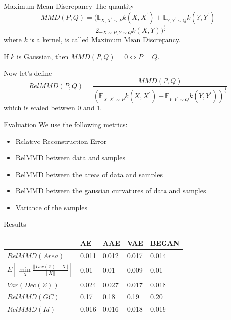 \documentclass{beamer}
\begin{document}
\begin{frame}{Maximum Mean Discrepancy}
The quantity $$MMD(P, Q)= (\mathbb{E}_{X, X^{\prime} \sim P} k\left(X, X^{\prime}\right)+\mathbb{E}_{Y, Y^{\prime} \sim Q} k\left(Y, Y^{\prime}\right)$$ $$-2 \mathbb{E}_{X \sim P, Y \sim Q} k(X, Y))^{\frac{1}{2}}$$ where $k$ is a kernel, is called Maximum Mean Discrepancy.
\begin{theorem}
If $k$ is Gaussian, then $MMD(P,Q)=0\Leftrightarrow P=Q$.
\end{theorem}
Now let's define $$RelMMD(P,Q)=\frac{MMD(P,Q)}{(\mathbb{E}_{X, X^{\prime} \sim P} k\left(X, X^{\prime}\right)+\mathbb{E}_{Y, Y^{\prime} \sim Q} k\left(Y, Y^{\prime}\right))^{\frac{1}{2}}}$$
which is scaled between 0 and 1.
\end{frame}
\begin{frame}{Evaluation}
We use the following metrics:
\begin{itemize}
\item Relative Reconstruction Error
\item RelMMD between data and samples
\item RelMMD between the areas of data and samples
\item RelMMD between the gaussian curvatures of data and samples
\item Variance of the samples
\end{itemize}
\end{frame}
\begin{frame}{Results}
\begin{table}[H]
\begin{tabular}{|l|l|l|l|l|}
\hline
&   AE & AAE &  VAE &  BEGAN  \\ \hline
$RelMMD(Area)$  &  0.011 &  0.012 & 0.017 &  0.014  \\ \hline
$E[\min\limits_{X} \frac{||Dec(Z)-X||}{||X||}]$&  0.01 & 0.01 &  0.009 &  0.01   \\ \hline
$Var(Dec(Z))$& 0.024 &   0.027 &  0.017 &  0.018  \\ \hline
$RelMMD(GC)$ & 0.17 & 0.18 &  0.19 &  0.20 \\ \hline
$RelMMD(Id)$ &  0.016 &  0.016 &  0.018 &  0.019 \\ \hline
\end{tabular}
\end{table}
\end{frame}
\end{document}
